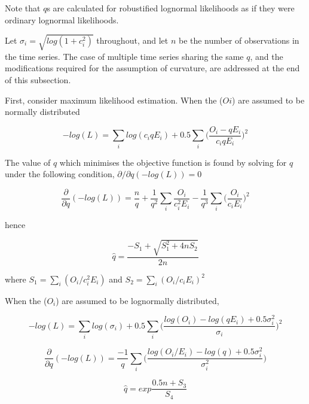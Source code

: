 Note that $q$s are calculated for robustified lognormal likelihoods as if they were ordinary lognormal likelihoods.

Let $\sigma_i = \sqrt{log(1 + c_i^2)}$ throughout, and let $n$ be the number of observations in the time series. The case of multiple time series sharing the same $q$, and the modifications required for the assumption of curvature, are addressed at the end of this subsection.

First, consider maximum likelihood estimation. When the ($Oi$) are assumed to be normally distributed

\begin{equation}\label{EQ:1}
-log(L) = \sum_i log (c_iqE_i) + 0.5\sum_i \bigg(\frac{O_i - qE_i}{c_iqE_i} \bigg)^2
\end{equation}

The value of $q$ which minimises the objective function is found by solving for $q$ under the following condition, $\partial/\partial q(-log(L)) = 0$

\begin{equation}\label{EQ:2}
\frac{\partial }{\partial q}(-log(L)) = \frac{n}{q} + \frac{1}{q^2} \sum_i \frac{O_i}{c_i^2E_i} - \frac{1}{q^3} \sum_i \bigg(\frac{O_i}{c_iE_i}\bigg)^2
\end{equation}

hence

\begin{equation}\label{EQ:3}
\hat q = \frac{-S_1 + \sqrt{S_1^2 + 4nS_2}}{2n}
\end{equation}

where $S_1 = \sum_i (O_i/c_i^2E_i)$ and $S_2 = \sum_i (O_i/c_iE_i)^2$

When the ($O_i$) are assumed to be lognormally distributed,

\begin{equation}\label{EQ:4}
-log(L) = \sum_i log (\sigma_i) + 0.5\sum_i \bigg(\frac{log(O_i) - log(qE_i) + 0.5\sigma_i^2}{\sigma_i} \bigg)^2
\end{equation}

\begin{equation}\label{EQ:5}
\frac{\partial }{\partial q}(-log(L)) = \frac{-1}{q} \sum_i\bigg( \frac{log(O_i/E_i) - log(q) + 0.5\sigma_i^2}{\sigma_i^2}\bigg)
\end{equation}

\begin{equation}\label{EQ:6}
\hat q = exp\frac{0.5n + S_3}{S_4}
\end{equation}

